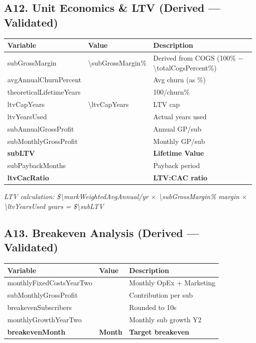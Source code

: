 \subsection*{A12. Unit Economics \& LTV (Derived --- Validated)}
\begin{tabularx}{\linewidth}{l Y X}
\toprule
\textbf{Variable} & \textbf{Value} & \textbf{Description} \\\midrule
subGrossMargin & \num{\subGrossMargin}\% & Derived from COGS (100\% $-$ \num{\totalCogsPercent}\%) \\
avgAnnualChurnPercent & \validatepct{\avgAnnualChurnPercent}{\HCavgAnnualChurnPercent} & Avg churn (as \%) \\
theoreticalLifetimeYears & \validate{\theoreticalLifetimeYears}{\HCtheoreticalLifetimeYears} & 100/churn\% \\
ltvCapYears & \num{\ltvCapYears} & LTV cap \\
ltvYearsUsed & \validate{\ltvYearsUsed}{\HCltvYearsUsed} & Actual years used \\
subAnnualGrossProfit & \validate{\subAnnualGrossProfit}{\HCsubAnnualGrossProfit} & Annual GP/sub \\
subMonthlyGrossProfit & \validate{\subMonthlyGrossProfit}{\HCsubMonthlyGrossProfit} & Monthly GP/sub \\
\textbf{subLTV} & \validate{\subLTV}{\HCsubLTV} & \textbf{Lifetime Value} \\
subPaybackMonths & \validatemonths{\subPaybackMonths}{\HCsubPaybackMonths} & Payback period \\
\textbf{ltvCacRatio} & \validateratio{\ltvCacRatio}{\HCltvCacRatio} & \textbf{LTV:CAC ratio} \\
\bottomrule
\end{tabularx}

\medskip
\textit{LTV calculation: \$\num{\markWeightedAvgAnnual}/yr $\times$ \num{\subGrossMargin}\% margin $\times$ \num{\ltvYearsUsed} years = \$\num{\subLTV}}

\subsection*{A13. Breakeven Analysis (Derived --- Validated)}
\begin{tabularx}{\linewidth}{l Y X}
\toprule
\textbf{Variable} & \textbf{Value} & \textbf{Description} \\\midrule
monthlyFixedCostsYearTwo & \validatemoney{\monthlyFixedCostsYearTwo}{\HCmonthlyFixedCostsYearTwo} & Monthly OpEx + Marketing \\
subMonthlyGrossProfit & \validate{\subMonthlyGrossProfit}{\HCsubMonthlyGrossProfit} & Contribution per sub \\
breakevenSubscribers & \validateint{\breakevenSubscribers}{\HCbreakevenSubscribers} & Rounded to 10s \\
monthlyGrowthYearTwo & \validate{\monthlyGrowthYearTwo}{\HCmonthlyGrowthYearTwo} & Monthly sub growth Y2 \\
\textbf{breakevenMonth} & \textbf{Month \validateint{\breakevenMonth}{\HCbreakevenMonth}} & \textbf{Target breakeven} \\
\bottomrule
\end{tabularx}

